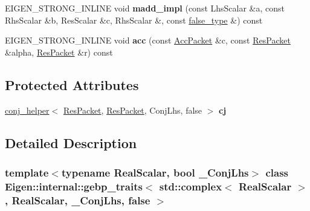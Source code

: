 \begin{DoxyCompactItemize}
E\+I\+G\+E\+N\+\_\+\+S\+T\+R\+O\+N\+G\+\_\+\+I\+N\+L\+I\+NE void {\bfseries madd\+\_\+impl} (const Lhs\+Scalar \&a, const Rhs\+Scalar \&b, Res\+Scalar \&c, Rhs\+Scalar \&, const \hyperlink{struct_eigen_1_1internal_1_1false__type}{false\+\_\+type} \&) const
\item 
\mbox{\label{class_eigen_1_1internal_1_1gebp__traits_3_01std_1_1complex_3_01_real_scalar_01_4_00_01_real_scald728c008ac4da8a5a1327d1e06be8c1f_a035d3a0d089572b96aa8c2477f3ab2ae}} 
E\+I\+G\+E\+N\+\_\+\+S\+T\+R\+O\+N\+G\+\_\+\+I\+N\+L\+I\+NE void {\bfseries acc} (const \hyperlink{class_eigen_1_1internal_1_1_tensor_lazy_evaluator_writable}{Acc\+Packet} \&c, const \hyperlink{class_eigen_1_1internal_1_1_tensor_lazy_evaluator_writable}{Res\+Packet} \&alpha, \hyperlink{class_eigen_1_1internal_1_1_tensor_lazy_evaluator_writable}{Res\+Packet} \&r) const
\end{DoxyCompactItemize}
\subsection*{Protected Attributes}
\begin{DoxyCompactItemize}
\item 
\mbox{\label{class_eigen_1_1internal_1_1gebp__traits_3_01std_1_1complex_3_01_real_scalar_01_4_00_01_real_scald728c008ac4da8a5a1327d1e06be8c1f_a3c989f2de5433cf2a83ecf8f95db327d}} 
\hyperlink{struct_eigen_1_1internal_1_1conj__helper}{conj\+\_\+helper}$<$ \hyperlink{class_eigen_1_1internal_1_1_tensor_lazy_evaluator_writable}{Res\+Packet}, \hyperlink{class_eigen_1_1internal_1_1_tensor_lazy_evaluator_writable}{Res\+Packet}, Conj\+Lhs, false $>$ {\bfseries cj}
\end{DoxyCompactItemize}


\subsection{Detailed Description}
\subsubsection*{template$<$typename Real\+Scalar, bool \+\_\+\+Conj\+Lhs$>$\newline
class Eigen\+::internal\+::gebp\+\_\+traits$<$ std\+::complex$<$ Real\+Scalar $>$, Real\+Scalar, \+\_\+\+Conj\+Lhs, false $>$}



